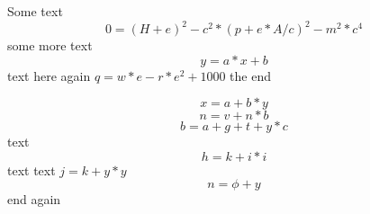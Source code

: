 \documentclass[a5paper,8pt]{article}
\begin{document}
Some text
\begin{equation}
    0 = (H + e)^2 - c^2 * (p + e * A / c)^2 - m^2 * c^4
\end{equation}
some more text
$$y = a * x + b$$
text here again
$q = w * e - r * e ^ 2 + 1000$
the end

$$
    x=a+b*y
$$
$$
    n=v+n*b
$$
\begin{equation}
    b=a+g+t+y*c
\end{equation}
text
$$
    h=k+i*i
$$ 
text
text
$j = k + y * y$
$$
    n=\phi+y
$$
end again
\end{document}
